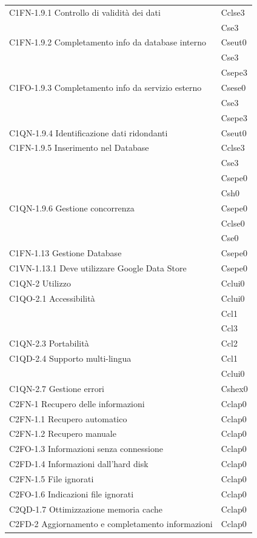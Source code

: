 \begin{footnotesize}
\begin{longtable}[!h]{|l|l|}
C1FN-1.9.1 Controllo di validit\`a dei dati & Cclse3\\
 & Cse3\\ \hline
C1FN-1.9.2 Completamento info da database interno & Cseut0\\
 & Cse3\\
 & Csepe3\\ \hline
C1FO-1.9.3 Completamento info da servizio esterno & Csese0\\ 
 & Cse3\\
 & Csepe3\\ \hline
C1QN-1.9.4 Identificazione dati ridondanti & Cseut0\\ \hline
C1FN-1.9.5 Inserimento nel Database & Cclse3\\
 & Cse3\\
 & Csepe0\\ 
 & Csh0\\ \hline
C1QN-1.9.6 Gestione concorrenza & Csepe0\\ 
 & Cclse0\\
 & Cse0\\ \hline
C1FN-1.13 Gestione Database & Csepe0\\ \hline
C1VN-1.13.1 Deve utilizzare Google Data Store & Csepe0\\ \hline
C1QN-2 Utilizzo & Cclui0\\ \hline
C1QO-2.1 Accessibilit\`a & Cclui0\\ 
 & Ccl1\\
 & Ccl3\\ \hline
C1QN-2.3 Portabilit\`a & Ccl2\\ \hline
C1QD-2.4 Supporto multi-lingua & Ccl1\\
 & Cclui0\\ \hline
C1QN-2.7 Gestione errori & Cshex0\\ \hline
C2FN-1 Recupero delle informazioni & Cclap0\\\hline
C2FN-1.1 Recupero automatico & Cclap0\\\hline
C2FN-1.2 Recupero manuale & Cclap0\\\hline
C2FO-1.3 Informazioni senza connessione & Cclap0\\ \hline
C2FD-1.4 Informazioni dall'hard disk & Cclap0\\\hline
C2FN-1.5 File ignorati & Cclap0\\\hline
C2FO-1.6 Indicazioni file ignorati & Cclap0\\ \hline
C2QD-1.7 Ottimizzazione memoria cache & Cclap0\\ \hline 
C2FD-2 Aggiornamento e completamento informazioni & Cclap0\\

\end{longtable}
\end{footnotesize}
